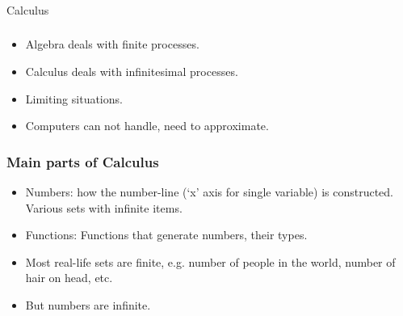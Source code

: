 \begin{frame}[fragile]\frametitle{}
\begin{center}
{\Large Calculus}
\end{center}
\end{frame}

 \begin{frame}[fragile]\frametitle{}
\begin{itemize}
\item Algebra deals with finite processes.
\item Calculus deals with infinitesimal processes.
\item Limiting situations.
\item Computers can not handle, need to approximate.
\end{itemize}
\end{frame}



 \begin{frame}[fragile]\frametitle{Main parts of Calculus}
\begin{itemize}
\item Numbers: how the number-line (`x' axis for single variable) is constructed. Various sets with infinite items.
\item Functions: Functions that generate numbers, their types.
\item Most real-life sets are finite, e.g. number of people in the world, number of hair on head, etc.
\item But numbers are infinite.
\end{itemize}
\end{frame}



